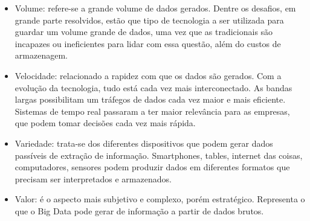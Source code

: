 \begin{itemize}
  \item Volume: refere-se a grande volume de dados gerados. Dentre os desafios, em grande parte resolvidos, estão que tipo de tecnologia a ser utilizada para guardar um volume grande de dados, uma vez que as tradicionais são incapazes ou ineficientes para lidar com essa questão, além do custos de armazenagem.
  \item Velocidade: relacionado a rapidez com que os dados são gerados. Com a evolução da tecnologia, tudo está cada vez mais interconectado. As bandas largas possibilitam um tráfegos de dados cada vez maior e mais eficiente. Sistemas de tempo real passaram a ter maior relevância para as empresas, que podem tomar decisões cada vez mais rápida.
  \item Variedade: trata-se dos diferentes dispositivos que podem gerar dados passíveis de extração de informação. Smartphones, tables, internet das coisas, computadores, sensores podem produzir dados em diferentes formatos que precisam ser interpretados e armazenados.
  \item Valor: é o aspecto mais subjetivo e complexo, porém estratégico. Representa o que o Big Data pode gerar de informação a partir de dados brutos.
\end{itemize}















